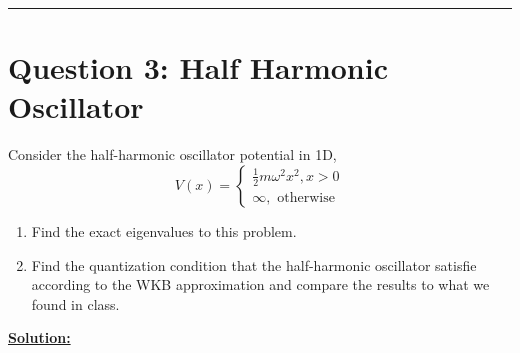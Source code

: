 \documentclass{article}
\begin{document}
\vskip 0.5cm


\vskip 0.5cm 
\hrule 
\vskip 0.5cm




\section*{Question 3: Half Harmonic Oscillator} 

Consider the half-harmonic oscillator potential in 1D,
\[ V(x) = \begin{cases}
  \frac{1}{2}m\omega^2 x^2, x > 0\\
  \infty, \text{ otherwise}
\end{cases}  \]

\begin{enumerate}[label=(\alph*)]
  \item Find the exact eigenvalues to this problem.
  \item Find the quantization condition that the half-harmonic oscillator satisfie according to the WKB approximation and compare the results to what we found in class.
\end{enumerate}

\vskip 0.5cm
\underline{\textbf{Solution:}} 
\end{document}
